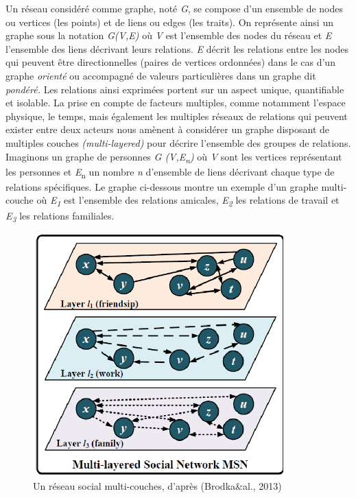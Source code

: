 Un réseau considéré comme graphe, noté \textit{G}, se compose d{\textquoteright}un ensemble de nodes ou vertices (les points) et de liens ou edges (les traits). On représente ainsi un graphe sous la notation \textit{G(V,E)} o\`u \textit{V }est l{\textquoteright}ensemble des nodes du réseau et \textit{E} l{\textquoteright}ensemble des liens\textit{ }décrivant leurs relations. \textit{E }décrit les relations entre les nodes qui peuvent \^etre directionnelles (paires de vertices ordonnées) dans le cas d{\textquoteright}un graphe \textit{orienté }ou accompagné de valeurs particulières dans un graphe dit \textit{pondéré. }Les relations ainsi exprimées portent sur un aspect unique, quantifiable et isolable. La prise en compte de facteurs multiples, comme notamment l{\textquoteright}espace physique, le temps, mais également les multiples réseaux de relations qui peuvent exister entre deux acteurs nous amènent à considérer un graphe disposant de multiples couches \textit{(}\textit{multi-layered)} pour décrire l{\textquoteright}ensemble des groupes de relations. Imaginons un graphe de personnes \textit{G (V,E}\textit{\textsubscript{n}}\textit{)} o\`u \textit{V }sont les vertices représentant les personnes et \textit{E}\textsubscript{n} un nombre \textit{n }d{\textquoteright}ensemble de liens\textit{ }décrivant chaque type de relations spécifiques. Le graphe ci-dessous montre un exemple d{\textquoteright}un graphe multi-couche o\`u \textit{E}\textit{\textsubscript{1}} est l{\textquoteright}ensemble des relations amicales, \textit{E}\textit{\textsubscript{2}}\textsubscript{ }les relations de travail et \textit{E}\textit{\textsubscript{3}}\textsubscript{ }les relations familiales.

\begin{figure}
    \centering
    \includegraphics[width=3.8004in,height=3.6894in]{figures/chap3/chapitre3-img3.png}
    \caption [réseau social multi-couches] {Un réseau social multi-couches, d{\textquoteright}après (Brodka\&al., 2013)}
\end{figure}

